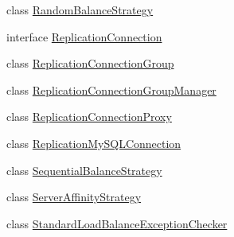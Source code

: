 \begin{DoxyCompactItemize}
\item 
class \mbox{\hyperlink{classcom_1_1mysql_1_1cj_1_1jdbc_1_1ha_1_1_random_balance_strategy}{Random\+Balance\+Strategy}}
\item 
interface \mbox{\hyperlink{interfacecom_1_1mysql_1_1cj_1_1jdbc_1_1ha_1_1_replication_connection}{Replication\+Connection}}
\item 
class \mbox{\hyperlink{classcom_1_1mysql_1_1cj_1_1jdbc_1_1ha_1_1_replication_connection_group}{Replication\+Connection\+Group}}
\item 
class \mbox{\hyperlink{classcom_1_1mysql_1_1cj_1_1jdbc_1_1ha_1_1_replication_connection_group_manager}{Replication\+Connection\+Group\+Manager}}
\item 
class \mbox{\hyperlink{classcom_1_1mysql_1_1cj_1_1jdbc_1_1ha_1_1_replication_connection_proxy}{Replication\+Connection\+Proxy}}
\item 
class \mbox{\hyperlink{classcom_1_1mysql_1_1cj_1_1jdbc_1_1ha_1_1_replication_my_s_q_l_connection}{Replication\+My\+S\+Q\+L\+Connection}}
\item 
class \mbox{\hyperlink{classcom_1_1mysql_1_1cj_1_1jdbc_1_1ha_1_1_sequential_balance_strategy}{Sequential\+Balance\+Strategy}}
\item 
class \mbox{\hyperlink{classcom_1_1mysql_1_1cj_1_1jdbc_1_1ha_1_1_server_affinity_strategy}{Server\+Affinity\+Strategy}}
\item 
class \mbox{\hyperlink{classcom_1_1mysql_1_1cj_1_1jdbc_1_1ha_1_1_standard_load_balance_exception_checker}{Standard\+Load\+Balance\+Exception\+Checker}}
\end{DoxyCompactItemize}
